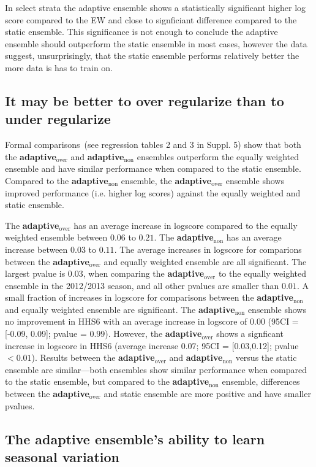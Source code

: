 \documentclass[sagev,times,Review,10pt]{sagej}
\def\adaptNon{\textbf{adaptive$_{\text{non}}$ }}
\def\adaptOver{\textbf{adaptive$_{\text{over}}$ }}
\begin{document}
In select strata the adaptive ensemble shows a statistically significant higher log score compared to the EW and close to signficiant difference compared to the static ensemble. 
This significance is not enough to conclude the adaptive ensemble should outperform the static ensemble in most cases, however the data suggest, unsurprisingly, that the static ensemble performs relatively better the more data is has to train on.

\subsection{It may be better to over regularize than to under regularize}

Formal comparisons~(see regression tables 2 and 3 in Suppl. 5) show that both the \adaptOver and \adaptNon ensembles outperform the equally weighted ensemble and have similar performance when compared to the static ensemble.
Compared to the \adaptNon ensemble, the \adaptOver ensemble shows improved performance (i.e. higher log scores) against the equally weighted and static ensemble.

The \adaptOver has an average increase in logscore compared to the equally weighted ensemble between $0.06$ to $0.21$.
The \adaptNon has an average increase between $0.03$ to $0.11$.
The average increases in logscore for comparions between the \adaptOver and equally weighted ensemble are all significant. The largest pvalue is $0.03$, when comparing the \adaptOver to the equally weighted ensemble in the 2012/2013 season, and all other pvalues are smaller than $0.01$.
A small fraction of increases in logscore for comparisons between the \adaptNon and equally weighted ensemble are significant.
The \adaptNon ensemble shows no improvement in HHS6 with an average increase in logscore of 0.00 (95CI = [-0.09, 0.09]; pvalue = $0.99$).
However, the \adaptOver shows a signficant increase in logscore in HHS6 (average increase 0.07; 95CI = [0.03,0.12]; pvalue $< 0.01$). 
Results between the \adaptOver and \adaptNon versus the static ensemble are similar---both ensembles show similar performance when compared to the static ensemble, but compared to the \adaptNon ensemble, differences between the \adaptOver and static ensemble are more positive and have smaller pvalues.

\subsection{The adaptive ensemble's ability to learn seasonal variation}
\end{document}
